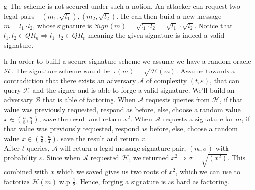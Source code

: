 \documentclass{article}
\begin{document}
\begin{paragraph}
    g The scheme is not secured under such a notion. An attacker can request two legal pairs - 
    $(m_1, \sqrt{l_1}), (m_2, \sqrt{l_2})$. He can then build a new message $m = l_1 \cdot l_2$,
    whose signature is $Sign(m) = \sqrt{l_1 \cdot l_2} = \sqrt{l_1}\cdot \sqrt{l_2}$.
    Notice that $l_1, l_2 \in QR_n \Rightarrow l_1 \cdot l_2 \in QR_n$ meaning the given signature
    is indeed a valid signature.
\end{paragraph}

\begin{paragraph}
    h In order to build a secure signature scheme we assume we have a random oracle $\mathcal{H}$.
    The signature scheme would be $\sigma(m) = \sqrt{\mathcal{H}(m)}$.
    Assume towards a contradiction that there exists an adversary $\mathcal{A}$ of complexity $(t, \varepsilon)$,
    that can query $\mathcal{H}$ and the signer and is able to forge a valid signature. We'll build an adversary
    $\mathcal{B}$ that is able of factoring. When $\mathcal{A}$ requests queries from $\mathcal{H}$, if that value was
    previously requested, respond as before, else, choose a random value $x \in (\frac{n}{8}, \frac{n}{4})$,
    save the result and return $x^2$. When $\mathcal{A}$ requests a signature for $m$, if that value was
    previously requested, respond as before, else, choose a random value $x \in (\frac{n}{8}, \frac{n}{4})$,
    save the result and return $x$. \\
    After $t$ queries, $\mathcal{A}$ will return a legal message-signature pair, $(m, \sigma)$ with probability $\varepsilon$.
    Since when $\mathcal{A}$ requested $\mathcal{H}$, we returned $x^2 \Rightarrow \sigma = \sqrt{(x^2)}$. This
    combined with $x$ which we saved gives us two roots of $x^2$, which we can use to factorize
    $\mathcal{H}(m)$ w.p $\frac{1}{2}$. Hence, forging a signature is as hard as factoring.
\end{paragraph}
\end{document}
